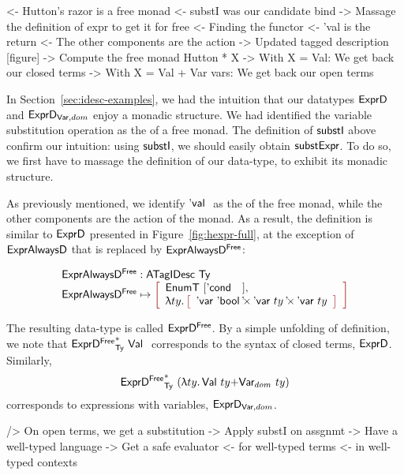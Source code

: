 \begin{wstructure}
<- Hutton's razor is a free monad
    <- substI was our candidate bind
        -> Massage the definition of expr to get it for free
    <- Finding the functor
        <- 'val is the return
        <- The other components are the action
        -> Updated tagged description [figure]
    -> Compute the free monad Hutton * X
        -> With X = Val: We get back our closed terms
        -> With X = Val + Var vars: We get back our open terms
\end{wstructure}

In Section~\ref{sec:idesc-examples}, we had the intuition that our
datatypes $\HExprD$ and $\HExprVarD{dom}$ enjoy a monadic structure. We had
identified the variable substitution operation as the \bind of a free
monad. The definition of $\substI$ above confirm our intuition: using
$\substI$, we should easily obtain $\substH$. To do so, we first have
to massage the definition of our data-type, to exhibit its monadic
structure.

As previously mentioned, we identify $\Eval{}$ as the \return of the
free monad, while the other components are the action of the monad. As
a result, the definition is similar to $\HExprD$ presented in
Figure~\ref{fig:hexpr-full}, at the exception of $\HExprAD$ that is
replaced by $\HExprAFreeD$:

\[\stk{
\HExprAFreeD : \ATagIDesc{\Ty} \\
\HExprAFreeD \mapsto \bigRedBracket{
                 \begin{array}{l}
                   \EnumT{\red{[}\Econd{}{}{}\red{]}} \red{,} \\
                   \LAM{ty}
                   \bigRedBracket{
                   \begin{array}{l}
                   \DProd{\DVar{\Ebool}}{\DProd{\DVar{ty}}{\DVar{ty}}}
                   \end{array}
                   }
                 \end{array}
                 }
}\]

The resulting data-type is called $\HExprFreeD$. By a simple unfolding
of definition, we note that $\FreeIMonad{\HExprFreeD}{\Ty}{\Val{}}$
corresponds to the syntax of closed terms, $\HExprD$. Similarly,
$$\FreeIMonad{\HExprFreeD}{\Ty}{(\LAM{ty} \SUM{\Val{ty}}{\Var{dom}{ty}})}$$
corresponds to expressions with variables, $\HExprVarD{dom}$.

\begin{wstructure}
    /> On open terms, we get a substitution
        -> Apply substI on assgnmt
            -> Have a well-typed language
            -> Get a safe evaluator 
                <- for well-typed terms 
                <- in well-typed contexts
\end{wstructure}

